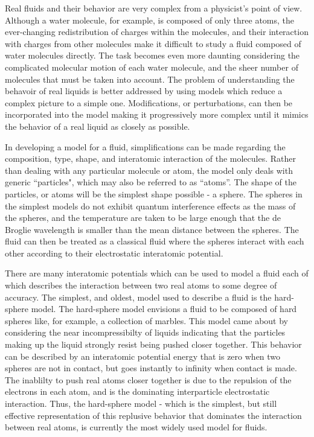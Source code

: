 \documentclass[double,12pt]{beavtex}
\begin{document}
Real fluids and their behavior are very complex from a physicist's point 
of view. Although a water molecule, for example, is composed of only three
atoms, the ever-changing redistribution of charges within the molecules, 
and their interaction with charges from other molecules make it difficult 
to study a fluid composed of water molecules directly. The task becomes 
even more daunting considering the complicated molecular motion of each 
water molecule, and the sheer number of molecules that must be taken 
into account. 
The problem of understanding the behavoir of real liquids is better addressed 
by using models which reduce a complex picture to a simple one. Modifications, 
or perturbations, can then be incorporated into the model making it 
progressively more complex until it mimics the behavior of a real 
liquid as closely as possible.

In developing a model for a fluid, simplifications can be made regarding 
the composition, type, shape, and interatomic interaction of the molecules. 
Rather than dealing with any particular molecule or atom, the model only 
deals with generic ``particles", which may also be referred to as ``atoms''. 
The shape of the particles, or atoms will be the simplest shape possible - 
a sphere. The spheres in the simplest models do not exhibit quantum 
interference effects as the mass of the spheres, and the temperature 
are taken to be large enough that the de Broglie wavelength is smaller 
than the mean distance between the spheres. The fluid can then be treated 
as a classical fluid where the spheres interact with each other according 
to their electrostatic interatomic potential. 

There are many interatomic potentials which can be used to model a fluid 
each of which describes the interaction between two real atoms to some 
degree of accuracy. The simplest, and oldest, model used to describe a 
fluid is the hard-sphere model. The hard-sphere model envisions a fluid 
to be composed of hard spheres like, for example, a collection of marbles. 
This model came about by considering the near incompressibilty of liquids 
indicating that the particles making up the liquid strongly resist being 
pushed closer together. This behavior can be described by an interatomic 
potential energy that is zero when two spheres are not in contact, but 
goes instantly to infinity when contact is made. The inablilty to push 
real atoms closer together is due to the repulsion of the electrons in 
each atom, and is the dominating interparticle electrostatic interaction. 
Thus, the hard-sphere model - which is the simplest, but still effective 
representation of this replusive behavior that dominates the interaction 
between real atoms, is currently the most widely used model for fluids.
\end{document}
